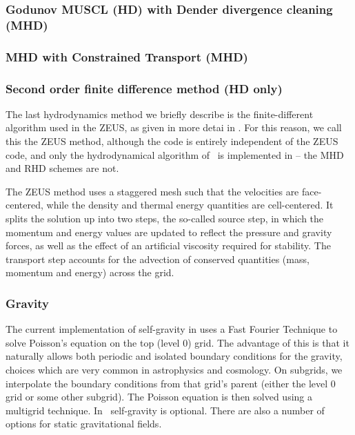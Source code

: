 
\subsubsection{Godunov MUSCL (HD) with Dender divergence cleaning (MHD)}

\subsubsection{MHD with Constrained Transport (MHD)}

\subsubsection{Second order finite difference method (HD only)}

The last hydrodynamics method we briefly describe is the finite-different algorithm used in the ZEUS, as given in more detai in \citet{Stone92a}.  For this reason, we call this the ZEUS method, although the code is entirely independent of the ZEUS code, and only the hydrodynamical algorithm of \zeus\ is implemented in \enzo -- the MHD and RHD schemes are not.

The ZEUS method uses a staggered mesh such that the velocities are face-centered, while the density and thermal energy quantities are cell-centered.  It splits the solution up into two steps, the so-called source step, in which the momentum and energy values are updated to reflect the pressure and gravity forces, as well as the effect of an artificial viscosity required for stability.  The transport step accounts for the advection of conserved quantities (mass, momentum and energy) across the grid.

\subsubsection{Gravity}

The current implementation of self-gravity in \enzo uses a Fast Fourier Technique \citep{Hockney88} to solve Poisson's equation on the top (level 0) grid.  The advantage of this is that it naturally allows both periodic and isolated boundary conditions for the gravity, choices which are very common in astrophysics and cosmology.  On subgrids, we interpolate the boundary conditions from that grid's parent (either the level 0 grid or some other subgrid).  The Poisson equation is then solved using a multigrid technique.  In \enzo\, self-gravity is optional.  There are also a number of options for static gravitational fields.

